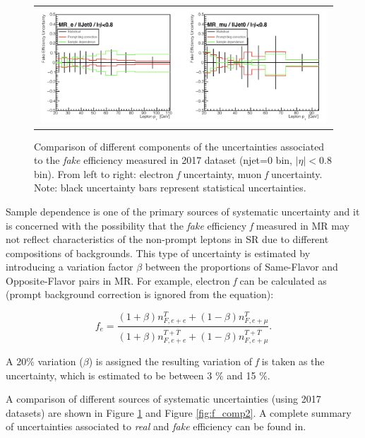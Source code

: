 \begin{figure}[tbh!]
 \begin{center}
 \begin{tabular}{c}
 \includegraphics[width=0.99\textwidth]{figures/Part3/Systematics/MR1}
 \end{tabular}
 \caption{Comparison of different components of the uncertainties associated to the \emph{fake} efficiency measured in 2017 dataset (njet=0 bin, $|\eta|<$0.8 bin). From left to right: electron \emph{f} uncertainty, muon \emph{f} uncertainty. Note: black uncertainty bars represent statistical uncertainties.}
 \label{fig:f_comp1}
 \end{center}
\end{figure}

Sample dependence is one of the primary sources of systematic uncertainty and it is concerned with the possibility that the \emph{fake} efficiency \emph{f} measured in MR may not reflect characteristics of the non-prompt leptons in SR due to different compositions of backgrounds. This type of uncertainty is estimated by introducing a variation factor $\beta$ between the proportions of Same-Flavor and Opposite-Flavor pairs in MR. For example, electron \emph{f} can be calculated as (prompt background correction is ignored from the equation): 

\begin{equation}
f_{e}=\frac{(1+\beta)n_{F,e+e}^{T}+(1-\beta)n_{F,e+\mu}^{T}}{(1+\beta)n_{F,e+e}^{T+\overline{T}}+(1-\beta)n_{F,e+\mu}^{T+\overline{T}}}.
 \label{eq:samp_dep}
\end{equation}

A 20$\%$ variation ($\beta$) is assigned the resulting variation of \emph{f} is taken as the uncertainty, which is estimated to be between 3 $\%$ and 15 $\%$. 
 
A comparison of different sources of systematic uncertainties (using 2017 datasets) are shown in Figure \ref{fig:f_comp1} and Figure \ref{fig:f_comp2}. A complete summary of uncertainties associated to \emph{real} and \emph{fake} efficiency can be found in.


